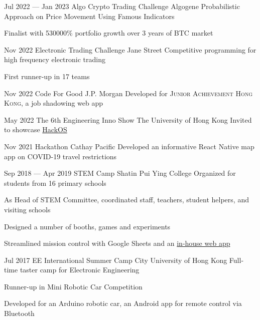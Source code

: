 \activityEntry
{Jul 2022 --- Jan 2023}
{Algo Crypto Trading Challenge}
{Algogene}
{Probabilistic Approach on Price Movement Using Famous Indicators}
{
\begin{descitemize}
    \specialitem Finalist with 530000\% portfolio growth over 3 years of BTC market
\end{descitemize}
}

\activityEntry
{Nov 2022}
{Electronic Trading Challenge}
{Jane Street}
{Competitive programming for high frequency electronic trading}
{
\begin{descitemize}
    \specialitem First runner-up in 17 teams
\end{descitemize}
}

\activityEntry
{Nov 2022}
{Code For Good}
{J.P. Morgan}
{Developed for {\scshape Junior Achievement Hong Kong}, a job shadowing web app}
{}

\activityEntry
{May 2022}
{The 6th Engineering Inno Show}
{The University of Hong Kong}
{Invited to showcase \hyperlink{HackOS}{HackOS}}
{}

\activityEntry
{Nov 2021}
{Hackathon}
{Cathay Pacific}
{Developed an informative React Native map app on COVID-19 travel restrictions}
{}

\activityEntry
{Sep 2018 --- Apr 2019}
{\hypertarget{STEM_Camp_2019}{STEM Camp}}
{Shatin Pui Ying College}
{Organized for students from 16 primary schools}
{
\begin{descitemize}
    \specialitem As Head of STEM Committee, coordinated staff, teachers, student helpers, and visiting schools
    \item Designed a number of booths, games and experiments
    \item Streamlined mission control with Google Sheets and an \hyperlink{RTRMS}{in-house web app}
\end{descitemize}
}

\activityEntry
{Jul 2017}
{EE International Summer Camp}
{City University of Hong Kong}
{Full-time taster camp for Electronic Engineering}
{
\begin{descitemize}
    \specialitem Runner-up in Mini Robotic Car Competition
    \item Developed for an Arduino robotic car, an Android app for remote control via Bluetooth
\end{descitemize}
}